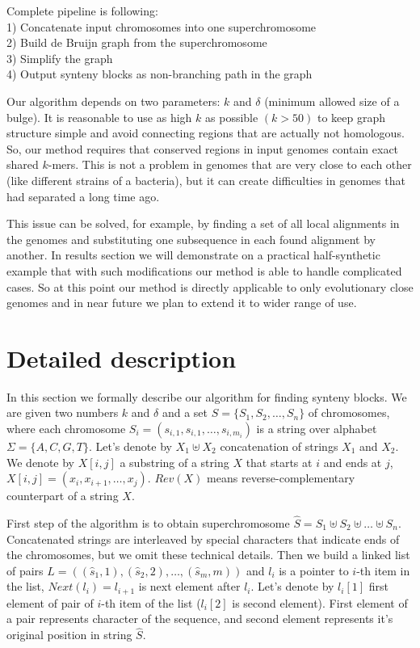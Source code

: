 \documentclass[a4paper,12pt]{scrartcl}
\begin{document}
Complete pipeline is following:\\
1) Concatenate input chromosomes into one superchromosome \\
2) Build de Bruijn graph from the superchromosome \\
3) Simplify the graph \\
4) Output synteny blocks as non-branching path in the graph 

Our algorithm depends on two parameters: \(k\) and \(\delta\) (minimum allowed size of a bulge). It is reasonable to use as high \(k\) as possible
\((k > 50)\) to keep graph structure simple and avoid connecting regions that are actually not homologous. So, our method requires that conserved regions
in input genomes contain exact shared \(k\)-mers. This is not a problem in genomes that are very close to each other (like different strains of a bacteria),
but it can create difficulties in genomes that had separated a long time ago.

This issue can be solved, for example, by finding a set of all local alignments in the genomes and substituting one subsequence in each found alignment
by another. In results section we will demonstrate on a practical half-synthetic example that with such modifications our method is able to handle
complicated cases. So at this point our method is directly applicable to only evolutionary close genomes and  in near future we plan to extend it to
wider range of use.

\section{Detailed description}

In this section we formally describe our algorithm for finding synteny blocks. We are given two numbers \(k\) and \(\delta\) and a
set \(S = \lbrace S_{1}, S_{2}, \ldots, S_{n} \rbrace \) of chromosomes,
where each chromosome  \(S_{i} = (s_{i, 1}, s_{i, 1}, \ldots, s_{i, m_i})\) is a string over alphabet \(\Sigma = \lbrace A, C, G, T \rbrace\).
Let's denote by \(X_{1} \uplus X_{2}\) concatenation of strings \(X_{1}\) and \(X_{2}\). We denote by \(X[i, j]\) a substring of a string \(X\) that
starts at \(i\) and ends at \(j\), \(X[i, j] = (x_{i}, x_{i + 1}, \ldots, x_{j}) \). \(Rev(X)\) means reverse-complementary counterpart of a string \(X\).

First step of the algorithm is to obtain superchromosome \(\hat{S} = S_{1} \uplus S_{2} \uplus \ldots \uplus S_{n} \). Concatenated
strings are interleaved by special characters that indicate ends of the chromosomes, but we omit these technical details. Then we build a linked list of
pairs \(L = ((\hat{s}_1, 1), (\hat{s}_2, 2), \ldots, (\hat{s}_{m}, m))\) and \(l_i\) is a pointer to \(i\)-th item in the list, \(Next(l_i) = l_{i + 1}\) is next
element after \(l_i\). Let's denote by \(l_i[1]\) first element of pair of \(i\)-th item of the list (\(l_i[2]\) is second element). First element of a pair represents
character of the sequence, and second element represents it's original position in string \(\hat{S}\). 
\end{document}

